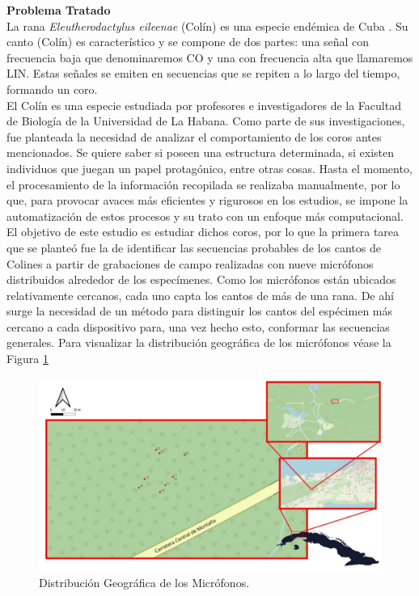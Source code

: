 \documentclass[a4paper,10pt,twocolumn]{article}
\begin{document}
\textbf{Problema Tratado}\\


La rana \textit{Eleutherodactylus eileenae} (Colín)  
es una especie endémica de Cuba \cite{colin}. 
Su canto (Colín) es característico y se compone de dos 
partes: una señal con frecuencia baja que 
denominaremos CO y una con frecuencia alta que 
llamaremos LIN. Estas señales se emiten en 
secuencias que se repiten a lo largo del tiempo, 
formando un coro.\\

El Colín es una especie estudiada por profesores e investigadores
de la Facultad de Biología de la Universidad de La Habana. Como parte de sus
investigaciones, fue planteada la necesidad de analizar el comportamiento de los 
coros antes mencionados. Se quiere saber si poseen una estructura determinada,
si existen individuos que juegan un papel protagónico, entre otras cosas. 
Hasta el momento, el procesamiento de la información recopilada se realizaba manualmente,
por lo que, para provocar avaces más eficientes y rigurosos en los estudios,
se impone la automatización de estos procesos y su trato con un enfoque más 
computacional.\\

El objetivo de este estudio es 
estudiar dichos coros, por lo que la primera tarea que se planteó fue la de
identificar las secuencias probables de los cantos de 
Colines a partir de grabaciones de campo realizadas con 
nueve micrófonos distribuidos alrededor de los 
especímenes. Como los micrófonos están ubicados
relativamente cercanos, cada uno capta los cantos de más de una rana. 
De ahí surge la necesidad de un método para distinguir los cantos
del espécimen más cercano a cada dispositivo para, una vez hecho esto, conformar
las secuencias generales. Para visualizar la distribución geográfica de los 
micrófonos véase la Figura \ref{fig:mics}

\begin{figure}[h!]
    \centering
    \includegraphics[width=\columnwidth]{assets/mic_map.jpg}
    \caption{Distribución Geográfica de los Micrófonos.}
    \label{fig:mics}
\end{figure}
\end{document}
